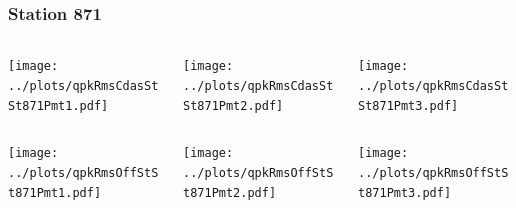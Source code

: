 \documentclass[aspectratio=169]{beamer}
\begin{document}
\begin{frame} 
  \frametitle{Station 871}
  \begin{center}
    \begin{columns}
      \begin{column}{0.33\textwidth}
        \texttt{[image: ../plots/qpkRmsCdasStSt871Pmt1.pdf]}
      \end{column}
      \begin{column}{0.33\textwidth}
        \texttt{[image: ../plots/qpkRmsCdasStSt871Pmt2.pdf]}
      \end{column}
      \begin{column}{0.33\textwidth}
        \texttt{[image: ../plots/qpkRmsCdasStSt871Pmt3.pdf]}
      \end{column}
    \end{columns}
  \end{center}

  \begin{center}
    \begin{columns}
      \begin{column}{0.33\textwidth}
        \texttt{[image: ../plots/qpkRmsOffStSt871Pmt1.pdf]}
      \end{column}
      \begin{column}{0.33\textwidth}
        \texttt{[image: ../plots/qpkRmsOffStSt871Pmt2.pdf]}
      \end{column}
      \begin{column}{0.33\textwidth}
        \texttt{[image: ../plots/qpkRmsOffStSt871Pmt3.pdf]}
      \end{column}
    \end{columns}
  \end{center}
\end{frame}
\end{document}
